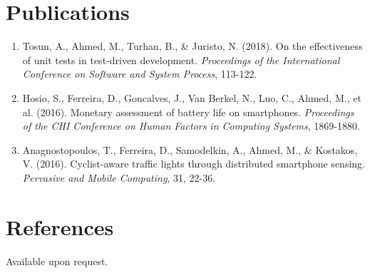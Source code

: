 \documentclass[12pt]{article}
\begin{document}
\section*{Publications}

\begin{enumerate}[leftmargin=1.5em]
    \item Tosun, A., Ahmed, M., Turhan, B., \& Juristo, N. (2018). On the effectiveness of unit tests in test-driven development. \textit{Proceedings of the International Conference on Software and System Process}, 113-122.
    \item Hosio, S., Ferreira, D., Goncalves, J., Van Berkel, N., Luo, C., Ahmed, M., et al. (2016). Monetary assessment of battery life on smartphones. \textit{Proceedings of the CHI Conference on Human Factors in Computing Systems}, 1869-1880.
    \item Anagnostopoulos, T., Ferreira, D., Samodelkin, A., Ahmed, M., \& Kostakos, V. (2016). Cyclist-aware traffic lights through distributed smartphone sensing. \textit{Pervasive and Mobile Computing}, 31, 22-36.
\end{enumerate}

\section*{References}

Available upon request.
\end{document}
